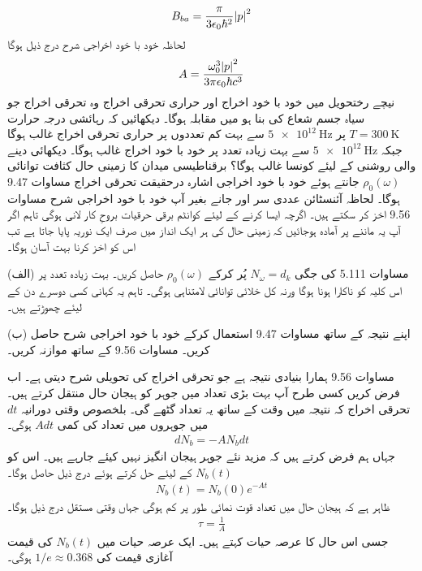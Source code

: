 \begin{align}
	B_{ba} = \frac{\pi}{3\epsilon_0\hbar^2}\abs{p}^2
\end{align}
لحاظہ خود با خود اخراجی شرح درج ذیل ہوگا
\begin{align}
	A = \frac{\omega^3_0\abs{p}^2}{3\pi\epsilon_0\hbar c^3}
\end{align}
نیچے رختحویل میں خود با خود اخراج اور حراری تحرقی اخراج وہ تحرقی اخراج جو سیاہ جسم شعاع کی بنا ہو میں مقابلہ ہوگا۔ دیکھائیں کہ رہائشی درجہ حرارت \(T = \SI{300}{\kelvin}\) پر \(\SI{5e12}{\hertz}\) سے بہت کم تعددوں پر حراری تحرقی اخراج غالب ہوگا جبکہ \(\SI{5e12}{\hertz}\) سے بہت زیادہ تعدد پر خود با خود اخراج غالب ہوگا۔ دیکھائی دینے والی روشنی کے لیئے کونسا غالب ہوگا؟
برقناطیسی میدان کا زمینی حال کثافت توانائی \(\rho_0(\omega)\) جانتے ہوئے خود با خود اخراجی اشارہ درحقیقت تحرقی اخراج مساوات \num{9.47} ہوگا۔ لحاظہ آئنسٹائن عددی سر  اور  جانے بغیر آپ خود با خود اخراجی شرح مساوات \num{9.56} اخز کر سکتے ہیں۔ اگرچہ ایسا کرنے کے لیئے کوانٹم برقی حرقیات بروحِ کار لانی ہوگی تاہم اگر آپ یہ ماننے پر آمادہ ہوجائیں کہ زمینی حال کی ہر ایک انداز میں صرف ایک نوریہ پایا جاتا ہے تب اس کو اخز کرنا بہت آسان ہوگا۔

(الف) مساوات \num{5.111} کی جگی \(N_\omega = d_k\) پُر کرکے \(\rho_0(\omega)\) حاصل کریں۔ بہت زیادہ تعدد پر اس کلیہ کو ناکارا ہونا ہوگا ورنہ کل خلائی توانائی لامتناہی ہوگی۔ تاہم یہ کہانی کسی دوسرے دن کے لیئے چھوڑتے ہیں۔

(ب) اپنے نتیجہ کے ساتھ مساوات \num{9.47} استعمال کرکے خود با خود اخراجی شرح حاصل کریں۔ مساوات \num{9.56} کے ساتھ موازنہ کریں۔


مساوات \num{9.56} ہمارا بنیادی نتیجہ ہے جو تحرقی اخراج کی تحویلی شرح دیتی ہے۔ اب فرض کریں کسی طرح آپ بہت بڑی تعداد میں جوہر کو ہیجان حال منتقل کرتے ہیں۔ تحرقی اخراج کہ نتیجہ میں وقت کے ساتھ یہ تعداد گٹھے گی۔ بلخصوص وقتی دورانیہ \(dt\) میں جوہروں میں تعداد کی کمی \(Adt\) ہوگی۔
\begin{align}
	dN_b = -AN_bdt
\end{align}
جہاں ہم فرض کرتے ہیں کہ مزید نئے جوہر ہیجان انگیز نہیں کیئے جارہے ہیں۔ اس کو \(N_b(t)\) کے لیئے حل کرتے ہوئے درج ذیل حاصل ہوگا۔
\begin{align}
	N_b(t) = N_b(0)e^{-At}
\end{align}
ظاہر ہے کہ ہیجان حال میں تعداد قوت نمائی طور پر کم ہوگی جہاں وقتی مستقل درج ذیل ہوگا۔
\begin{align}
	\tau = \frac{1}{A}
\end{align}
جسی اس حال کا عرصہ حیات کہتے ہیں۔ ایک عرصہ حیات میں \(N_b(t)\) کی قیمت آغازی قیمت کی \(1/e \approx \num{0.368}\) ہوگی۔

